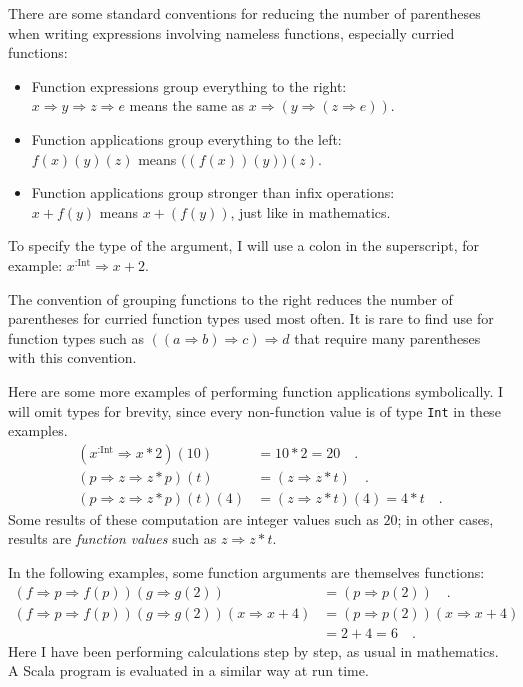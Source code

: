 There are some standard conventions for reducing the number of parentheses
when writing expressions involving nameless functions, especially
curried functions:
\begin{itemize}
\item Function expressions group everything to the right:\\
 $x\Rightarrow y\Rightarrow z\Rightarrow e$ means the same as $x\Rightarrow\left(y\Rightarrow\left(z\Rightarrow e\right)\right)$.
\item Function applications group everything to the left:\\
 $f(x)(y)(z)$ means $\big((f(x))(y)\big)(z)$. 
\item Function applications group stronger than infix operations:\\
 $x+f(y)$ means $x+(f(y))$, just like in mathematics.
\end{itemize}
To specify the type of the argument, I will use a colon in the superscript,
for example: $x^{:\text{Int}}\Rightarrow x+2$.

The convention of grouping functions to the right reduces the number
of parentheses for curried function types used most often. It is rare
to find use for function types such as $(\left(a\Rightarrow b\right)\Rightarrow c)\Rightarrow d$
that require many parentheses with this convention.

Here are some more examples of performing function applications symbolically.
I will omit types for brevity, since every non-function value is of
type \texttt{}\lstinline!Int! in these examples.
\begin{align*}
\left(x^{:\text{Int}}\Rightarrow x*2\right)(10) & =10*2=20\quad.\\
\left(p\Rightarrow z\Rightarrow z*p\right)\left(t\right) & =(z\Rightarrow z*t)\quad.\\
\left(p\Rightarrow z\Rightarrow z*p\right)(t)(4) & =(z\Rightarrow z*t)(4)=4*t\quad.
\end{align*}
Some results of these computation are integer values such as $20$;
in other cases, results are \emph{function} \emph{values}
such as $z\Rightarrow z*t$.

In the following examples, some function arguments are themselves
functions:
\begin{align*}
\left(f\Rightarrow p\Rightarrow f(p)\right)\left(g\Rightarrow g(2)\right) & =\left(p\Rightarrow p(2)\right)\quad.\\
\left(f\Rightarrow p\Rightarrow f(p)\right)\left(g\Rightarrow g(2)\right)\left(x\Rightarrow x+4\right) & =\left(p\Rightarrow p(2)\right)\left(x\Rightarrow x+4\right)\\
 & =2+4=6\quad.
\end{align*}
Here I have been performing calculations step by step, as usual in
mathematics. A Scala program is evaluated in a similar way at run
time.

